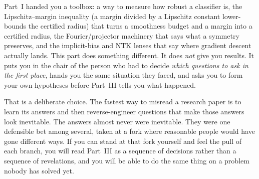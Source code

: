 %
%


Part~I handed you a toolbox: a way to measure how robust a classifier is, the Lipschitz--margin
inequality (a margin divided by a Lipschitz constant lower-bounds the certified radius) that turns
a smoothness budget and a margin into a certified radius,
the Fourier/projector machinery that says what a symmetry preserves, and the implicit-bias and
NTK lenses that say where gradient descent actually lands. This part does something different.
It does \emph{not} give you results. It puts you in the chair of the person who had to decide
\emph{which questions to ask in the first place}, hands you the same situation they faced, and asks
you to form your own hypotheses before Part~III tells you what happened.

That is a deliberate choice. The fastest way to misread a research paper is to learn its answers
and then reverse-engineer questions that make those answers look inevitable. The answers almost
never were inevitable. They were one defensible bet among several, taken at a fork where reasonable
people would have gone different ways. If you can stand at that fork yourself and feel the pull of
each branch, you will read Part~III as a sequence of decisions rather than a sequence of
revelations, and you will be able to do the same thing on a problem nobody has solved yet.

